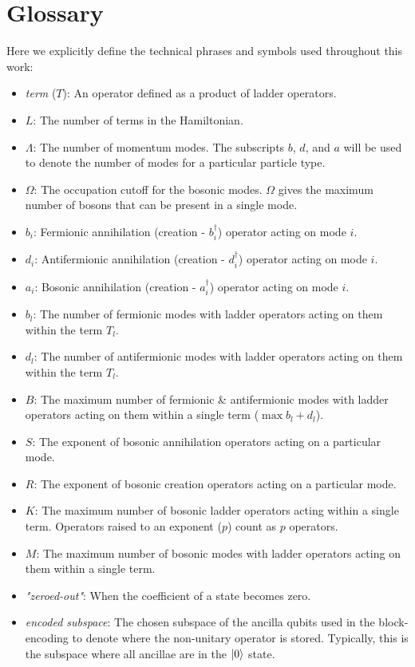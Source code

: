 \section{Glossary}
\label{sec:glossary}

Here we explicitly define the technical phrases and symbols used throughout this work:

\begin{itemize}
    \item \textit{term} ($T$): An operator defined as a product of ladder operators.
    \item $L$: The number of terms in the Hamiltonian.
    \item $\Lambda$: The number of momentum modes. The subscripts $b$, $d$, and $a$ will be used to denote the number of modes for a particular particle type.
    \item $\Omega$: The occupation cutoff for the bosonic modes. $\Omega$ gives the maximum number of bosons that can be present in a single mode. 
    \item $b_i$: Fermionic annihilation (creation - $b_i^\dagger$) operator acting on mode $i$.
    \item $d_i$: Antifermionic annihilation (creation - $d_i^\dagger$) operator acting on mode $i$.
    \item $a_i$: Bosonic annihilation (creation - $a_i^\dagger$) operator acting on mode $i$.
    \item $b_l$: The number of fermionic modes with ladder operators acting on them within the term $T_l$.
    \item $d_l$: The number of antifermionic modes with ladder operators acting on them within the term $T_l$.
    \item $B$: The maximum number of fermionic \& antifermionic modes with ladder operators acting on them within a single term ($\max{b_l + d_l}$).
    \item $S$: The exponent of bosonic annihilation operators acting on a particular mode.
    \item $R$: The exponent of bosonic creation operators acting on a particular mode.
    \item $K$: The maximum number of bosonic ladder operators acting within a single term. Operators raised to an exponent ($p$) count as $p$ operators.
    \item $M$: The maximum number of bosonic modes with ladder operators acting on them within a single term.
    \item \textit{"zeroed-out"}: When the coefficient of a state becomes zero.
    \item \textit{encoded subspace}: The chosen subspace of the ancilla qubits used in the block-encoding to denote where the non-unitary operator is stored. Typically, this is the subspace where all ancillae are in the $\ket{0}$ state.
\end{itemize}